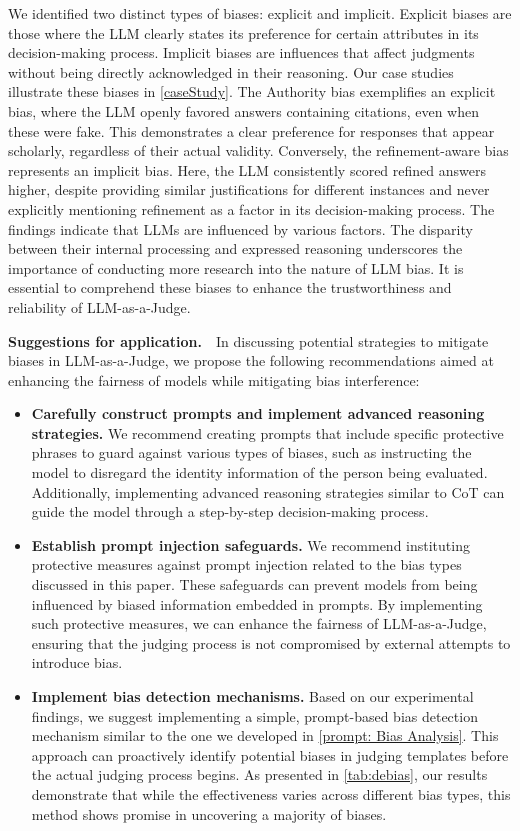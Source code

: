 \documentclass{article} %
\newcommand{\header}[1]{\noindent\textbf{{#1}}~~}
\begin{document}
   We identified two distinct types of biases: explicit and implicit. Explicit biases are those where the LLM clearly states its preference for certain attributes in its decision-making process. Implicit biases are influences that affect judgments without being directly acknowledged in their reasoning. Our case studies illustrate these biases in \autoref{caseStudy}. The Authority bias exemplifies an explicit bias, where the LLM openly favored answers containing citations, even when these were fake. This demonstrates a clear preference for responses that appear scholarly, regardless of their actual validity. Conversely, the refinement-aware bias represents an implicit bias. Here, the LLM consistently scored refined answers higher, despite providing similar justifications for different instances and never explicitly mentioning refinement as a factor in its decision-making process. The findings indicate that LLMs are influenced by various factors. The disparity between their internal processing and expressed reasoning underscores the importance of conducting more research into the nature of LLM bias. It is essential to comprehend these biases to enhance the trustworthiness and reliability of LLM-as-a-Judge.


\header{Suggestions for application.}In discussing potential strategies to mitigate biases in LLM-as-a-Judge, we propose the following recommendations aimed at enhancing the fairness of models while mitigating bias interference:
\begin{itemize}[leftmargin=*, itemsep=0pt, parsep=1pt]
    \item \textbf{Carefully construct prompts and implement advanced reasoning strategies.} We recommend creating prompts that include specific protective phrases to guard against various types of biases, such as instructing the model to disregard the identity information of the person being evaluated. Additionally, implementing advanced reasoning strategies similar to CoT can guide the model through a step-by-step decision-making process. 
    \item \textbf{Establish prompt injection safeguards.} We recommend instituting protective measures against prompt injection related to the bias types discussed in this paper. These safeguards can prevent models from being influenced by biased information embedded in prompts. By implementing such protective measures, we can enhance the fairness of LLM-as-a-Judge, ensuring that the judging process is not compromised by external attempts to introduce bias.
    \item \textbf{Implement bias detection mechanisms.} Based on our experimental findings, we suggest implementing a simple, prompt-based bias detection mechanism similar to the one we developed in \autoref{prompt: Bias Analysis}. This approach can proactively identify potential biases in judging templates before the actual judging process begins. As presented in \autoref{tab:debias}, our results demonstrate that while the effectiveness varies across different bias types, this method shows promise in uncovering a majority of biases.
\end{itemize}
\end{document}
